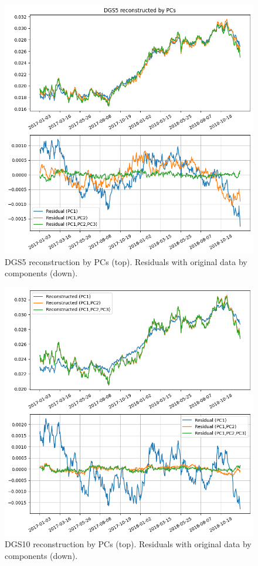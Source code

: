 \begin{figure}[hp]
	\centering
	\includegraphics[width=0.7\linewidth]{figures/pca_dsg5}
	\caption{DGS5 reconstruction by PCs (top). Residuals with original data by components (down).}
	\label{fig:pca_dsg5}
\end{figure}

\begin{figure}[hp]
	\centering
	\includegraphics[width=0.7\linewidth]{figures/pca_dsg10}
	\caption{DGS10 reconstruction by PCs (top). Residuals with original data by components (down).}
	\label{fig:pca_dsg10}
\end{figure}

